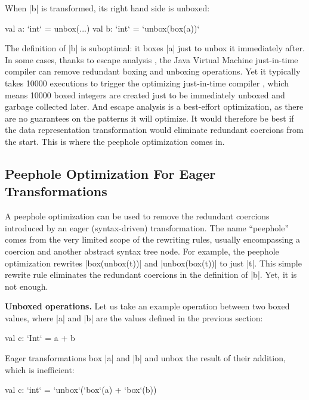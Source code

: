 When |b| is transformed, its right hand side is unboxed:

\begin{lstlisting-nobreak}
 val a: `int` = unbox(...)
 val b: `int` = `unbox(box(a))`
\end{lstlisting-nobreak}

The definition of |b| is suboptimal: it boxes |a| just to unbox it immediately after. In some cases, thanks to escape analysis \cite{stadler-escape-analysis}, the Java Virtual Machine just-in-time compiler \cite{hotspot-c1, hotspot-c2} can remove redundant boxing and unboxing operations. Yet it typically takes 10000 executions to trigger the optimizing just-in-time compiler \cite{hotspot-c2-thresholds}, which means 10000 boxed integers are created just to be immediately unboxed and garbage collected later. And escape analysis is a best-effort optimization, as there are no guarantees on the patterns it will optimize. It would therefore be best if the data representation transformation would eliminate redundant coercions from the start. This is where the peephole optimization comes in.

\subsection{Peephole Optimization For Eager Transformations}
\label{ldl:sec:problem/peephole}

A peephole optimization \cite{spj-unboxed-values, miniboxing} can be used to remove the redundant coercions introduced by an eager (syntax-driven) transformation. The name ``peephole'' comes from the very limited scope of the rewriting rules, usually encompassing a coercion and another abstract syntax tree node. For example, the peephole optimization rewrites |box(unbox(t))| and |unbox(box(t))| to just |t|. This simple rewrite rule eliminates the redundant coercions in the definition of |b|. Yet, it is not enough.

\textbf{Unboxed operations.} Let us take an example operation between two boxed values, where |a| and |b| are the values defined in the previous section:

\begin{lstlisting-nobreak}
 val c: `Int` = a + b
\end{lstlisting-nobreak}

Eager transformations box |a| and |b| and unbox the result of their addition, which is inefficient:

\begin{lstlisting-nobreak}
 val c: `int` = `unbox`(`box`(a) + `box`(b))
\end{lstlisting-nobreak}


